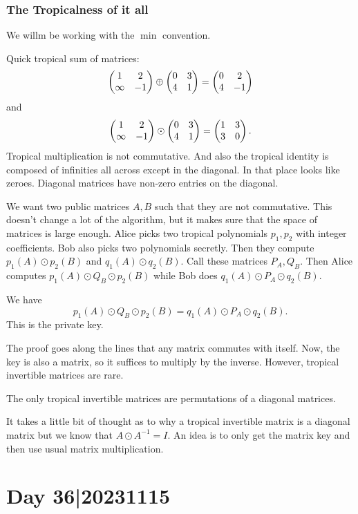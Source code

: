 \documentclass[12pt]{memoir}
\begin{document}
\subsubsection{The Tropicalness of it all}

We willm be working with the $\min$ convention. 

\begin{Ex}
    Quick tropical sum of matrices:
    $$\begin{pmatrix} 1 & 2 \\ \infty & -1 \end{pmatrix}\oplus\begin{pmatrix} 0 & 3 \\ 4 & 1 \end{pmatrix}=\begin{pmatrix} 0 & 2 \\ 4 & -1 \end{pmatrix}$$
    and
    $$\begin{pmatrix} 1 & 2 \\ \infty & -1 \end{pmatrix}\odot\begin{pmatrix} 0 & 3 \\ 4 & 1 \end{pmatrix}=\begin{pmatrix} 1 & 3 \\ 3 & 0 \end{pmatrix}.$$
    Tropical multiplication is not commutative. And also the tropical identity is composed of infinities all across except in the diagonal. In that place looks like zeroes. Diagonal matrices have non-zero entries on the diagonal.
\end{Ex}

We want two public matrices $A,B$ such that they are not commutative. This doesn't change a lot of the algorithm, but it makes sure that the space of matrices is large enough. Alice picks two tropical polynomials $p_1,p_2$ with integer coefficients. Bob also picks two polynomials secretly. Then they compute $p_1(A)\odot p_2(B)$ and $q_1(A)\odot q_2(B)$. Call these matrices $P_A,Q_B$. Then Alice computes $p_1(A)\odot Q_B\odot p_2(B)$ while Bob does $q_1(A)\odot P_A\odot q_2(B)$.

\begin{Lem}
We have 
$$p_1(A)\odot Q_B\odot p_2(B)=q_1(A)\odot P_A\odot q_2(B).$$
This is the private key.
\end{Lem}

The proof goes along the lines that any matrix commutes with itself. Now, the key is also a matrix, so it suffices to multiply by the inverse. However, tropical invertible matrices are rare. 

\begin{Prop}
The only tropical invertible matrices are permutations of a diagonal matrices.
\end{Prop}

It takes a little bit of thought as to why a tropical invertible matrix is a diagonal matrix but we know that $A\odot A^{-1}=I$.  An idea is to only get the matrix key and then use usual matrix multiplication.

\section{Day 36|20231115}
\end{document}
